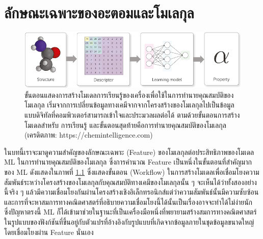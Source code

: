 

\chapter{ลักษณะเฉพาะของอะตอมและโมเลกุล}
\label{ch:feature}

\begin{figure}[H]
    \centering
    \includegraphics[width=\linewidth]{fig/workflow_chem_ml.png}
    \caption{ขั้นตอนแสดงการสร้างโมเดลการเรียนรู้ของเครื่องเพื่อใช้ในการทำนายคุณสมบัติของโมเลกุล เริ่มจากการเปลี่ยนข้อมูลทางเคมีจากจากโครงสร้างของโมเลกุลไปเป็นข้อมูลแบบดิจิทัลที่คอมพิวเตอร์สามารถเข้าใจและประมวลผลต่อได้ ตามด้วยขั้นตอนการสร้างโมเดลสำหรับ        การเรียนรู้ และขั้นตอนสุดท้ายคือการทำนายคุณสมบัติของโมเลกุล (เครดิตภาพ: https://chemintelligence.com)}
    \label{fig:workflow_chem_ml}
\end{figure}

ในบทนี้เราจะมาดูความสำคัญของลักษณะเฉพาะ (Feature) ของโมเลกุลต่อประสิทธิภาพของโมเดล ML ในการทำนายคุณสมบัติของโมเลกุล\autocite{yang2019a} ซึ่งการคำนวณ Feature เป็นหนึ่งในขั้นตอนที่สำคัญมากของ ML ดังแสดงในภาพที่ \ref{fig:workflow_chem_ml} ซึ่งแสดงขั้นตอน (Workflow) ในการสร้างโมเดลเพื่อเชื่อมโยงความสัมพันธ์ระหว่างโครงสร้างของโมเลกุลกับคุณสมบัติทางเคมีของโมเลกุลนั้น ๆ จะเห็นได้ว่าทั้งสองอย่างนี้จริง ๆ แล้วมีความเชื่อมโยงกันผ่านโครงสร้างเชิงอิเล็กทรอนิกส์แต่ว่าความสัมพันธ์นั้นมีความซับซ้อนและการที่จะหาสมการทางคณิตศาสตร์ที่อธิบายความเชื่อมโยงนี้ได้นั้นเป็นเรื่องอาจจะทำได้ไม่ง่ายนัก ซึ่งปัญหาตรงนี้ ML ก็ได้เข้ามาช่วยในฐานะที่เป็นเครื่องมือหนึ่งที่พยายามสร้างสมการทางคณิตศาสตร์ในรูปแบบของฟังก์ชันที่ขึ้นอยู่กับตัวแปรที่อ้างอิงกับรูปแบบที่เกิดจากข้อมูลภายในชุดข้อมูลขนาดใหญ่โดยเชื่อมโยงผ่าน Feature นั่นเอง

